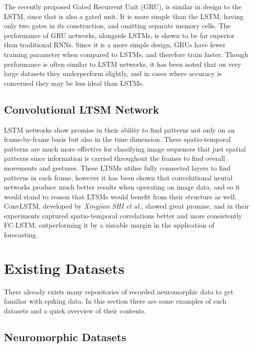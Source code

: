 The recently proposed Gated Recurrent Unit (GRU), is similar in design to the LSTM, since that is also a gated unit. It is more simple than the LSTM, having only two gates in its construction, and omitting separate memory cells. The performance of GRU networks, alongside LSTMs, is shown to be far superior than traditional RNNs\cite{GRU}. Since it is a more simple design, GRUs have fewer training parameter when compared to LSTMs, and therefore train faster. Though performance is often similar to LSTM networks, it has been noted that on very large datasets they underperform slightly, and in cases where accuracy is concerned they may be less ideal than LSTMs.

\subsection{Convolutional LTSM Network} \label{ssec:conv_lstm}

LSTM networks show promise in their ability to find patterns not only on an frame-by-frame basis but also in the time dimension. These spatio-temporal patterns are much more effective for classifying image sequences that just spatial patterns since information is carried throughout the frames to find overall movements and gestures. These LTSMs utilise fully connected layers to find patterns in each frame, however it has been shown that convolutional neural networks produce much better results when operating on image data, and so it would stand to reason that LTSMs would benefit from their structure as well. ConvLSTM, developed by \textit{Xingjian SHI et al.}\cite{ConvLTSM}, showed great promise, and in their experiments captured spatio-temporal correlations better and more consistently FC-LSTM, outperforming it by a sizeable margin in the application of forecasting.

\section{Existing Datasets} \label{sec:existing_datasets}

There already exists many repositories of recorded neuromorphic data to get familiar with spiking data. In this section there are some examples of such datasets and a quick overview of their contents.

\subsection{Neuromorphic Datasets} \label{ssec:neuromorphic_datasets}

